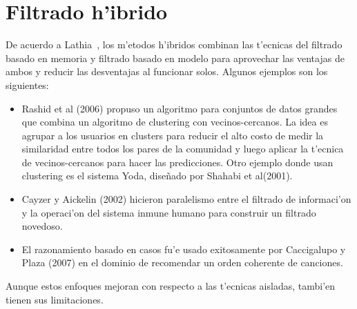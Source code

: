 \documentclass[11pt]{article}
\begin{document}
\section{Filtrado h'ibrido}

De acuerdo a Lathia~\cite{recsys:nlathia}, los m'etodos h'ibridos combinan las t'ecnicas del filtrado basado en memoria y filtrado basado en modelo para aprovechar las ventajas de ambos y reducir las desventajas al funcionar solos. Algunos ejemplos son los siguientes:

\begin{itemize}
\item Rashid et al (2006) propuso un algoritmo para conjuntos de datos grandes que combina un algoritmo de clustering con vecinos-cercanos. La idea es agrupar a los usuarios en clusters para reducir el alto costo de medir la similaridad entre todos los pares de la comunidad y luego aplicar la t'ecnica de vecinos-cercanos para hacer las predicciones. Otro ejemplo donde usan clustering es el sistema Yoda, dise\~{n}ado por Shahabi et al(2001).
\item Cayzer y Aickelin (2002) hicieron paralelismo entre el filtrado de informaci'on y la operaci'on del sistema inmune humano para construir un filtrado novedoso.
\item El razonamiento basado en casos fu'e usado exitosamente por Caccigalupo y Plaza (2007) en el dominio de recomendar un orden coherente de canciones.
\end{itemize}

Aunque estos enfoques mejoran con respecto a las t'ecnicas aisladas, tambi'en tienen sus limitaciones.
\end{document}
